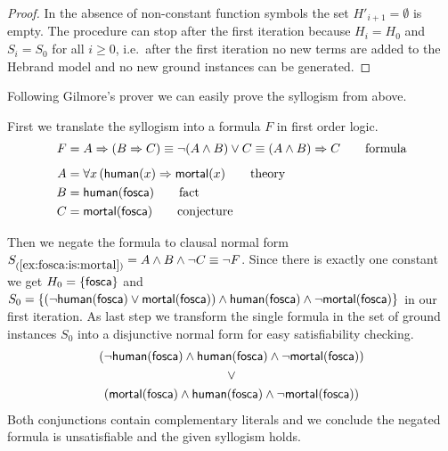 \begin{proof}
	In the absence of non-constant function symbols the set $H'_{i+1} = \emptyset$ is empty.
	The procedure can stop after the first iteration because 
	$H_i = H_0$ and $S_i = S_0$ for all $i\geq0$,
	i.e.~after the first iteration 
	no new terms are added to the Hebrand model 
	and no new ground instances can be generated.
\end{proof}

Following Gilmore's prover we can easily prove the syllogism from above.

\begin{example}\label{ex:fosca:is:mortal}
	First we translate the syllogism into a formula $F$ in first order logic.
	\begin{align*}
	F &= A \Rightarrow (B \Rightarrow C) \equiv \lnot(A\land B) \lor C \equiv (A\land B)\Rightarrow C  
	\tag*{formula}
	\\[0.5em]
	A &= \forall x\, ( \mathsf{human}(x) \Rightarrow \mathsf{mortal}(x) 
	\tag*{theory}
	\\
	B &= \mathsf{human}(\mathsf{fosca}) 
	\tag*{fact}
	\\
	C &= \mathsf{mortal}(\mathsf{fosca})
	\tag*{conjecture}
	\end{align*}
	
	
	
	Then we negate the formula to clausal normal form $S_{(\ref{ex:fosca:is:mortal})} = A\land B \land\lnot C \equiv \lnot F$.
	Since there is exactly one constant we get
	$H_0 = \{ \mathsf{fosca} \}$ and 
	$S_0 = 
	\{
	(\lnot\mathsf{human}(\mathsf{fosca})\lor\mathsf{mortal}(\mathsf{fosca}))\land\mathsf{human}(\mathsf{fosca})\land\lnot\mathsf{mortal}(\mathsf{fosca})
	\}$ in our first iteration. 
	As last step we transform the single formula in 
	the set of ground instances $S_0$ into a disjunctive normal form 
	for easy satisfiability checking.
	\begin{gather*}
	(\lnot\mathsf{human}(\mathsf{fosca})\land\mathsf{human}(\mathsf{fosca})\land\lnot\mathsf{mortal}(\mathsf{fosca}))
	\\ 
	\lor
	\\ 
	(\mathsf{mortal}(\mathsf{fosca})\land\mathsf{human}(\mathsf{fosca})\land\lnot\mathsf{mortal}(\mathsf{fosca}))
	\end{gather*}
	Both conjunctions contain complementary literals and we conclude the negated formula is unsatisfiable
	and the given syllogism holds.
	
\end{example}

